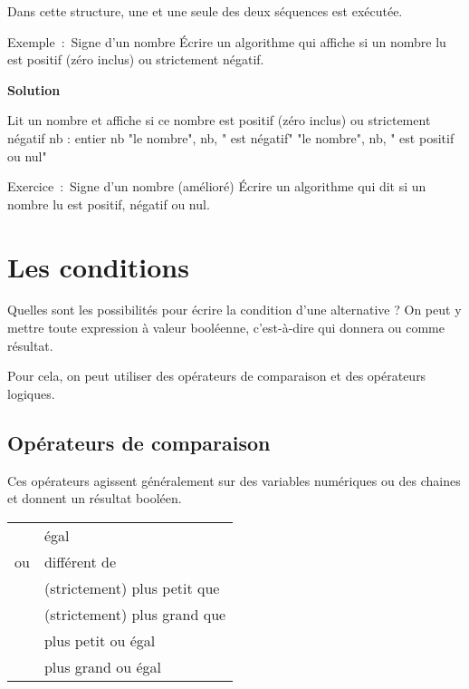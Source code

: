 	Dans cette structure, une et une seule des deux séquences est exécutée.
	
	\begin{Emphase}[exercice]{Exemple~:~Signe d’un nombre}
		Écrire un algorithme qui affiche si un nombre lu est positif 
		(zéro inclus) ou strictement négatif.
		
		{\bfseries Solution}
		
		\begin{Pseudocode}
		\LComment Lit un nombre et affiche si ce nombre est positif (zéro inclus)
		ou strictement négatif
			\Decl nb : entier
			\Read nb
				\Write "le nombre", nb, " est négatif"
			\Else
				\Write "le nombre", nb, " est positif ou nul"
			\EndIf
		\EndModule
		\end{Pseudocode}
	\end{Emphase}
	
	
	\begin{Emphase}[exercice]{Exercice~:~Signe d’un nombre (amélioré)}
		Écrire un algorithme qui dit si un nombre lu est positif, 
		négatif ou nul.
	\end{Emphase}

\section{Les conditions}

	Quelles sont les possibilités pour écrire la condition
	d'une alternative ?
	On peut y mettre toute expression à valeur booléenne,
	c'est-à-dire qui donnera  ou 
	comme résultat.
	
	Pour cela, on peut utiliser des opérateurs de comparaison
	et des opérateurs logiques.
	
	\subsection{Opérateurs de comparaison}

		Ces opérateurs agissent généralement sur des variables numériques ou des
		chaines et donnent un résultat booléen.

		\begin{center}
		\begin{tabular}{m{2cm}|m{11cm}}
		\raggedleft  \pseudocode{=} & égal\\
		\raggedleft  \pseudocode{{\textless}{\textgreater}}
			ou \pseudocode{${\neq}$} &  différent de\\
		\raggedleft  \pseudocode{\textless} & (strictement) plus petit que\\
		\raggedleft  \pseudocode{\textgreater} & (strictement) plus grand que\\
		\raggedleft  \pseudocode{${\leq}$} & plus petit ou égal\\
		\raggedleft  \pseudocode{${\geq}$} & plus grand ou égal\\
		\end{tabular}
		\end{center}

